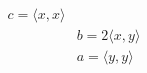 \documentclass[preview]{standalone}
\begin{document}
\begin{align*}
c=\langle x,x \rangle \\& b= 2\langle x,y \rangle \\& a=\langle y,y \rangle \\&
\end{align*}
\end{document}
